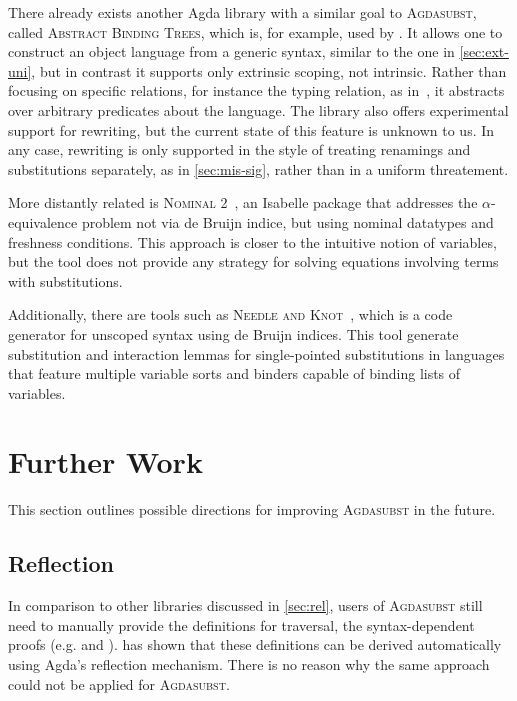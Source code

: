 \documentclass[screen,nonacm]{acmart}
\begin{document}
There already exists another Agda library with a similar goal to
\textsc{Agdasubst}, called \textsc{Abstract Binding Trees}, which is, for
example, used by \citet{siek2021parameterized}. It allows one to construct an
object language from a generic syntax, similar to the one in
\cref{sec:ext-uni}, but in contrast it supports only extrinsic scoping, not
intrinsic. Rather than focusing on specific relations, for instance the typing
relation, as in~\cite{saffrich:LIPIcs.ITP.2024.32}, it abstracts over arbitrary
predicates about the language. The library also offers experimental support for
rewriting, but the current state of this feature is unknown to us. In any case,
rewriting is only supported in the style of treating renamings and
substitutions separately, as in \cref{sec:mis-sig}, rather than in a uniform
threatement.

More distantly related is \textsc{Nominal 2}~\cite{Nominal2-AFP}, an Isabelle
package that addresses the $\alpha$-equivalence problem not via de Bruijn
indice, but using nominal datatypes and freshness conditions. This approach is
closer to the intuitive notion of variables, but the tool does not provide any
strategy for solving equations involving terms with substitutions.

Additionally, there are tools such as \textsc{Needle and
      Knot}~\cite{10.1007/978-3-662-49498-1_17}, which is a code generator for
unscoped syntax using de Bruijn indices. This tool generate substitution and
interaction lemmas for single-pointed substitutions in languages that feature
multiple variable sorts and binders capable of binding lists of variables.

\section{Further Work}\label{sec:wrk}
This section outlines possible directions for improving \textsc{Agdasubst} in
the future.

\subsection*{Reflection}
In comparison to other libraries discussed in \cref{sec:rel}, users of
\textsc{Agdasubst} still need to manually provide the definitions for
traversal, the syntax-dependent proofs (e.g.  and
). \citeauthor{saffrich:LIPIcs.ITP.2024.32} has
shown that these definitions can be derived automatically using Agda's
reflection mechanism. There is no reason why the same approach could not be
applied for \textsc{Agdasubst}.
\end{document}
